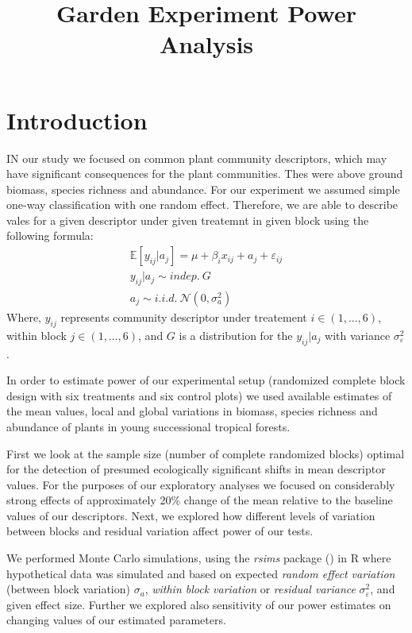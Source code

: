 \documentclass[]{article}
\title{Garden Experiment Power Analysis}
\author{}
\date{}
\begin{document}
\maketitle

\section{Introduction}\label{introduction}

IN our study we focused on common plant community descriptors, which may
have significant consequences for the plant communities. Thes were above
ground biomass, species richness and abundance. For our experiment we
assumed simple one-way classification with one random effect. Therefore,
we are able to describe vales for a given descriptor under given
treatemnt in given block using the following formula:
\[\begin{matrix} \mathbb{E} [y_{ij}|a_j] = \mu + \beta_ix_{ij} + a_j + \varepsilon_{ij} \\ y_{ij}|a_j \sim indep.\ G\\ a_j \sim i.i.d.\ \mathcal{N}(0,\sigma_a^2) \end{matrix}\]
Where, \(y_{ij}\) represents community descriptor under treatement
\(i \in (1,..., 6)\), within block \(j \in (1,..., 6)\), and \(G\) is a
distribution for the \(y_{ij}|a_j\) with variance
\(\sigma^2_{\varepsilon}\).

In order to estimate power of our experimental setup (randomized
complete block design with six treatments and six control plots) we used
available estimates of the mean values, local and global variations in
biomass, species richness and abundance of plants in young successional
tropical forests.

First we look at the sample size (number of complete randomized blocks)
optimal for the detection of presumed ecologically significant shifts in
mean descriptor values. For the purposes of our exploratory analyses we
focused on considerably strong effects of approximately 20\% change of
the mean relative to the baseline values of our descriptors. Next, we
explored how different levels of variation between blocks and residual
variation affect power of our tests.

We performed Monte Carlo simulations, using the \emph{rsims} package ()
in R where hypothetical data was simulated and based on expected
\emph{random effect variation} (between block variation) \(\sigma_{a}\),
\emph{within block variation} or \emph{residual variance}
\(\sigma^2_{\varepsilon}\), and given effect size. Further we explored
also sensitivity of our power estimates on changing values of our
estimated parameters.
\end{document}

